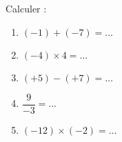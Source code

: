 
\begin{exercice}\label{exosmath-0815}

    Calculer :
    \begin{enumerate}
        \item
            \( (-1)+(-7)=\ldots\)
        \item
            \( (-4)\times 4=\ldots\)
        \item
            \( (+5)-(+7)=\ldots\)
        \item
            \( \dfrac{ 9 }{ -3 }=\ldots\)
        \item
            \( (-12)\times (-2)=\ldots\)
    \end{enumerate}


\end{exercice}
